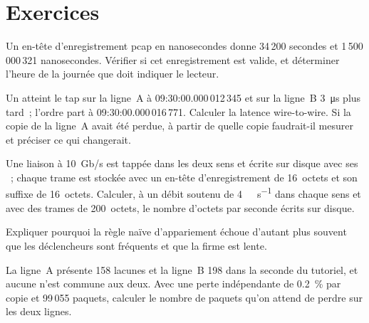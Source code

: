 \section{Exercices}

\begin{exercise}[$\star$]\label{exo:nw:capturing-and-monitoring-the-network:1}
Un en-tête d'enregistrement pcap en nanosecondes donne 34\,200 secondes et 1\,500\,000\,321 nanosecondes. Vérifier si cet enregistrement est valide,
et déterminer l'heure de la journée que doit indiquer le lecteur.
\end{exercise}

\begin{exercise}[$\star$]\label{exo:nw:capturing-and-monitoring-the-network:2}
Un  atteint le tap sur la ligne~A à 09:30:00.000\,012\,345 et sur la ligne~B \qty{3}{\micro\second} plus tard~; l'ordre part à
09:30:00.000\,016\,771. Calculer la latence wire-to-wire. Si la copie de la ligne~A avait été perdue, à partir de quelle copie faudrait-il mesurer
et préciser ce qui changerait.
\end{exercise}

\begin{exercise}[$\star$]\label{exo:nw:capturing-and-monitoring-the-network:3}
Une liaison à 10~Gb/s est tappée dans les deux sens et écrite sur disque avec ses ~; chaque trame est stockée avec un en-tête d'enregistrement de 16~octets et
son suffixe de 16~octets. Calculer, à un débit soutenu de \qty{4}{\giga\bit\per\second} dans chaque sens et avec des trames de 200~octets, le nombre d'octets par seconde écrits sur disque.
\end{exercise}

\begin{exercise}[$\star\star$]\label{exo:nw:capturing-and-monitoring-the-network:4}
Expliquer pourquoi la règle naïve d'appariement échoue d'autant plus souvent que les déclencheurs sont fréquents et que la firme est lente.
\end{exercise}

\begin{exercise}[$\star\star$]\label{exo:nw:capturing-and-monitoring-the-network:5}
La ligne~A présente 158 lacunes et la ligne~B 198 dans la seconde du tutoriel, et aucune n'est commune aux deux. Avec une perte indépendante de 0.2~\% par copie et 99\,055
paquets, calculer le nombre de paquets qu'on attend de perdre sur les deux lignes.
\end{exercise}


